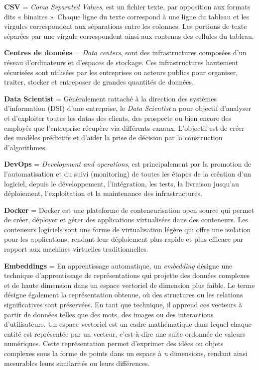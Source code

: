 \textbf{CSV} = \textit{Coma Separated Values}, est un fichier texte, par opposition aux formats dits « binaires ». Chaque ligne du texte correspond à une ligne du tableau et les virgules correspondent aux séparations entre les colonnes. Les portions de texte séparées par une virgule correspondent ainsi aux contenus des cellules du tableau.

\textbf{Centres de données} = \textit{Data centers}, sont des infrastructures composées d’un réseau d’ordinateurs et d’espaces de stockage. Ces infrastructures hautement sécurisées sont utilisées par les entreprises ou acteurs publics pour organiser, traiter, stocker et entreposer de grandes quantités de données.

\textbf{Data Scientist} = Généralement rattaché à la direction des systèmes d'information (DSI) d’une entreprise, le \textit{Data Scientist} a pour objectif d’analyser et d’exploiter toutes les datas des clients, des prospects ou bien encore des employés que l’entreprise récupère via différents canaux. L’objectif est de créer des modèles prédictifs et d’aider la prise de décision par la construction d'algorithmes.

\textbf{DevOps} = \textit{Development and operations}, est principalement par la promotion de l'automatisation et du suivi (monitoring) de toutes les étapes de la création d'un logiciel, depuis le développement, l'intégration, les tests, la livraison jusqu'au déploiement, l'exploitation et la maintenance des infrastructures.

\textbf{Docker} = Docker est une plateforme de conteneurisation open source qui permet de créer, déployer et gérer des applications virtualisées dans des conteneurs. Les conteneurs logiciels sont une forme de virtualisation légère qui offre une isolation pour les applications, rendant leur déploiement plus rapide et plus efficace par rapport aux machines virtuelles traditionnelles.

\textbf{Embeddings} = En apprentissage automatique, un \textit{embedding} désigne une technique d’apprentissage de représentations qui projette des données complexes et de haute dimension dans un espace vectoriel de dimension plus faible. Le terme désigne également la représentation obtenue, où des structures ou les relations significatives sont préservées. En tant que technique, il apprend ces vecteurs à partir de données telles que des mots, des images ou des interactions d’utilisateurs. Un espace vectoriel est un cadre mathématique dans lequel chaque entité est représentée par un vecteur, c’est-à-dire une suite ordonnée de valeurs numériques. Cette représentation permet d’exprimer des idées ou objets complexes sous la forme de points dans un espace à \textit{n} dimensions, rendant ainsi mesurables leurs similarités ou leurs différences.

